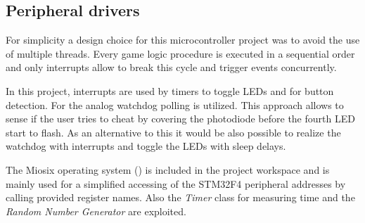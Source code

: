 \subsection{Peripheral drivers}
For simplicity a design choice for this microcontroller project was to avoid the use of multiple threads. Every game logic procedure is executed in a sequential order and only interrupts allow to break this cycle and trigger events concurrently.\\
\par
In this project, interrupts are used by timers to toggle LEDs and for button detection. For the analog watchdog polling is utilized.
This approach allows to sense if the user tries to cheat by covering the photodiode before the fourth LED start to flash. As an alternative to this it would be also possible to realize the watchdog with interrupts and toggle the LEDs with sleep delays.\\
\par
The Miosix operating system (\cite{Miosix}) is included in the project workspace and is mainly used for a simplified accessing of the STM32F4 peripheral addresses by calling provided register names. Also the \emph{Timer} class for measuring time and the \emph{Random Number Generator} are exploited.

